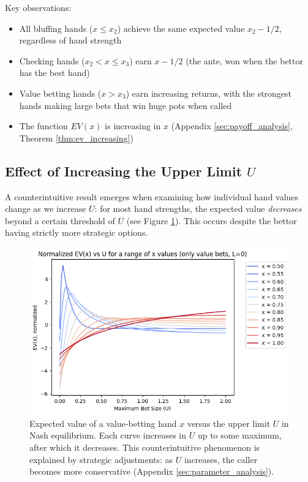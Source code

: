 \documentclass[../../main/main.tex]{subfiles}
\begin{document}
Key observations:
\begin{itemize}
    \item All bluffing hands ($x \leq x_2$) achieve the same expected value $x_2 - 1/2$, regardless of hand strength
    \item Checking hands ($x_2 < x \leq x_3$) earn $x - 1/2$ (the ante, won when the bettor has the best hand)
    \item Value betting hands ($x > x_3$) earn increasing returns, with the strongest hands making large bets that win huge pots when called
    \item The function $EV(x)$ is increasing in $x$ (Appendix \ref{sec:payoff_analysis}, Theorem \ref{thm:ev_increasing})
\end{itemize}

\subsection{Effect of Increasing the Upper Limit $U$}

A counterintuitive result emerges when examining how individual hand values change as we increase $U$: for most hand strengths, the expected value \emph{decreases} beyond a certain threshold of $U$ (see Figure \ref{fig:ev_x_vs_U}). This occurs despite the bettor having strictly more strategic options.

\begin{figure}[h!]
    \centering
    \includegraphics[width=\textwidth]{../parameter_analysis/images/ev_vs_U.png}
    \caption{Expected value of a value-betting hand $x$ versus the upper limit $U$ in Nash equilibrium. Each curve increases in $U$ up to some maximum, after which it decreases. This counterintuitive phenomenon is explained by strategic adjustments: as $U$ increases, the caller becomes more conservative (Appendix \ref{sec:parameter_analysis}).}
    \label{fig:ev_x_vs_U}
\end{figure}
\end{document}

